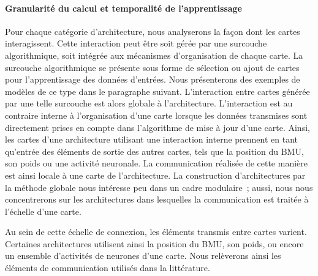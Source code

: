 \documentclass[../main]{subfiles}
\begin{document}
\paragraph{Granularité du calcul et temporalité de l'apprentissage}

Pour chaque catégorie d'architecture, nous analyserons la façon dont les cartes interagissent.
Cette interaction peut être soit gérée par une surcouche algorithmique, soit intégrée aux mécanismes d'organisation de chaque carte.
La surcouche algorithmique se présente sous forme de sélection ou ajout de cartes pour l'apprentissage des données d'entrées.
Nous présenterons des exemples de modèles de ce type dans le paragraphe suivant. L'interaction entre cartes générée par une telle surcouche est alors globale à l'architecture.
L'interaction est au contraire interne à l'organisation d'une carte lorsque les données transmises sont directement prises en compte dans l'algorithme de mise à jour d'une carte. Ainsi, les cartes d'une architecture utilisant une interaction interne prennent en tant qu'entrée des éléments de sortie des autres cartes, tels que la position du BMU, son poids ou une activité neuronale. La communication réalisée de cette manière est ainsi locale à une carte de l'architecture. 
La construction d'architectures par la méthode globale nous intéresse peu dans un cadre modulaire~; aussi, nous nous concentrerons sur les architectures dans lesquelles la communication est traitée à l'échelle d'une carte.

Au sein de cette échelle de connexion, les éléments transmis entre cartes varient. 
Certaines architectures utilisent ainsi la position du BMU, son poids, ou encore un ensemble d'activités de neurones d'une carte. Nous relèverons ainsi les éléments de communication utilisés dans la littérature.
\end{document}

